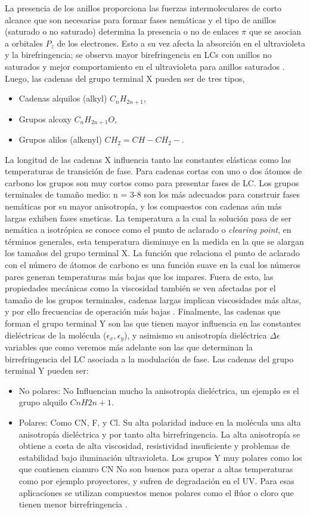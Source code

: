 La presencia de los anillos proporciona las fuerzas intermoleculares de corto alcance que
son necesarias para formar fases nemáticas y el tipo de anillos
(saturado o no saturado) determina la presencia o no de enlaces $\pi$
que se asocian a orbitales $P_z$ de los electrones. Esto a su vez
afecta la absorción en el ultravioleta y la birefringencia; se observa mayor
birefringencia en LCs con anillos no saturados y mejor comportamiento
en el ultravioleta para anillos saturados .  Luego, las cadenas del
grupo terminal X pueden ser de tres tipos,
\begin{itemize}
\item Cadenas alquilos (alkyl)  $C_nH_{2n+1}$,
\item Grupos alcoxy $C_nH_{2n+1}O$,
\item Grupos alilos (alkenyl) $CH_2=CH-CH_2-$.
\end{itemize}
 La longitud de las cadenas X influencia tanto las constantes elásticas
 como las temperaturas de transición de fase. Para cadenas cortas con
 uno o dos átomos de carbono los grupos son muy cortos como para
 presentar fases de LC. Los grupos terminales de tamaño medio: n = 3-8
 son los más adecuados para construir fases nemáticas por su
 mayor anisotropía, y los compuestos con cadenas aún más largas
 exhiben fases smeticas. La temperatura a la cual la solución pasa de
 ser nemática a isotrópica se conoce como el punto de aclarado o
 \textit{clearing point}, en términos generales, esta temperatura
 disminuye en la medida en la que se alargan los tamaños del 
 grupo terminal X. La función que relaciona el punto de aclarado con
 el número de átomos de carbono es una función suave en la cual los
 números pares generan temperaturas más bajas que los impares. Fuera
 de esto, las propiedades mecánicas como la viscosidad también se ven
 afectadas por el tamaño de los grupos terminales, cadenas
 largas implican viscosidades más altas, y por ello frecuencias de
 operación más bajas . 
Finalmente, las cadenas que forman el grupo terminal Y son las que
tienen mayor influencia en las constantes dieléctricas de la molécula
($\epsilon_x,\epsilon_y$), y asimismo su anisotropía dieléctrica
$\Delta\epsilon$ variables que como veremos más adelante son las que
determinan la birrefringencia del LC asociada a la modulación de fase.
Las cadenas del grupo terminal Y pueden ser:
\begin{itemize}
\item No polares: No Influencian mucho la anisotropía dieléctrica, un
  ejemplo es el grupo alquilo $CnH2n+1$.
\item Polares:  Como CN, F, y Cl. Su alta polaridad induce en la
  molécula una alta anisotropía dieléctrica y por tanto alta
  birrefringencia. La alta anisotropía se obtiene a costa de alta viscosidad, resistividad
  insuficiente y problemas de estabilidad bajo iluminación 
  ultravioleta. Los grupos Y muy polares como los que contienen
  cianuro CN No son buenos para operar a  altas temperaturas como por
  ejemplo proyectores, y sufren de degradación en el UV. Para esas
  aplicaciones se utilizan compuestos menos polares como el flúor o
  cloro que tienen menor birrefringencia .
\end{itemize}

